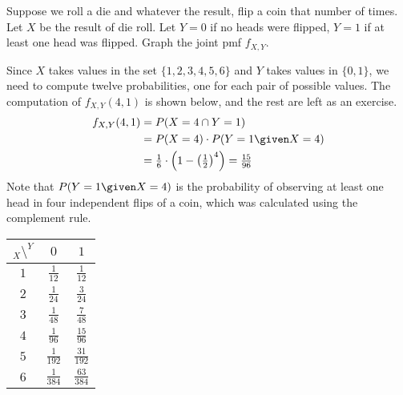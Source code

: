 \begin{example}\label{DieCoinJointPMF} Suppose we roll a die and whatever the result, flip a coin that number of times. Let $X$ be the result of die roll. Let $Y = 0$ if no heads were flipped, $Y=1$ if at least one head was flipped. Graph the joint pmf $f_{X,Y}$.
\par
\noindent Since $X$ takes values in the set $\{1,2,3,4,5,6\}$ and $Y$ takes values in $\{0,1\}$, we need to compute twelve probabilities, one for each pair of possible values. The computation of $f_{X,Y}(4,1)$ is shown below, and the rest are left as an exercise.
$$\begin{aligned}f_{X,Y}(4,1) &= P(X = 4 \cap  Y = 1) \\ 
&= P(X=4)\cdot P(Y = 1 \given X = 4) \\
& = \textstyle\frac{1}{6} \cdot \left(1 - \left(\textstyle\frac{1}{2}\right)^{4}\right) = \frac{15}{96}\end{aligned}$$
\noindent Note that $P(Y = 1 \given X = 4)$ is the probability of observing at least one head in four independent flips of a coin, which was calculated using the complement rule.

\begin{center}
\hspace*{0.5in}\begin{minipage}{0.2\textwidth}
\centering
\renewcommand{\arraystretch}{1.5}
\begin{tabular}{c|cc}
$_{X} \setminus ^Y$ & $0$ & $1$ \\
\hline
$1$ & $\frac{1}{12}$ & $\frac{1}{12}$ \\
$2$ & $\frac{1}{24}$ & $\frac{3}{24}$ \\
$3$ & $\frac{1}{48}$ & $\frac{7}{48}$ \\
$4$ & $\frac{1}{96}$ & $\frac{15}{96}$ \\
$5$ & $\frac{1}{192}$ & $\frac{31}{192}$ \\
$6$ & $\frac{1}{384}$ & $\frac{63}{384}$ \\
\end{tabular}
\renewcommand{\arraystretch}{1}
\end{minipage}\begin{minipage}{0.7\textwidth}
\centering
\newcommand{\myGlobalTransformation}[2]
{
    \pgftransformcm{1}{0}{0.4}{0.5}{\pgfpoint{#1cm}{#2cm}}
}
\newcommand{\gridThreeD}[3]
{
    \begin{scope}
        \myGlobalTransformation{#1}{#2};
        \draw [#3,step=1cm] grid (7,3);
    \end{scope}
}


\end{minipage}
\end{center}
\end{example}
